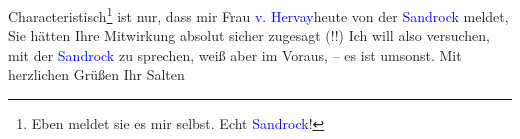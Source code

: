 \pstart
           Characteristisch\footnote{\noindent{}Eben meldet sie es mir selbst. Echt \textcolor{blue}{Sandrock}!} ist nur, dass mir Frau \textcolor{blue}{v. Hervay}{}\ledrightnote{\textcolor{blue}{Elvira Leontine Hervay von Kirchberg}}{ }heute von der \textcolor{blue}{Sandrock}{}\ledrightnote{\textcolor{blue}{Adele Sandrock}} meldet, Sie hätten Ihre Mitwirkung absolut sicher zugesagt (!!) Ich
               will also versuchen, mit der \textcolor{blue}{Sandrock}{}\ledrightnote{\textcolor{blue}{Adele Sandrock}} zu
               sprechen, weiß aber im Voraus, – es ist umsonst.\pend
           \pstart Mit herzlichen Grüßen Ihr \spacefill\mbox{Salten}\pend{}\endnumbering{}  
      